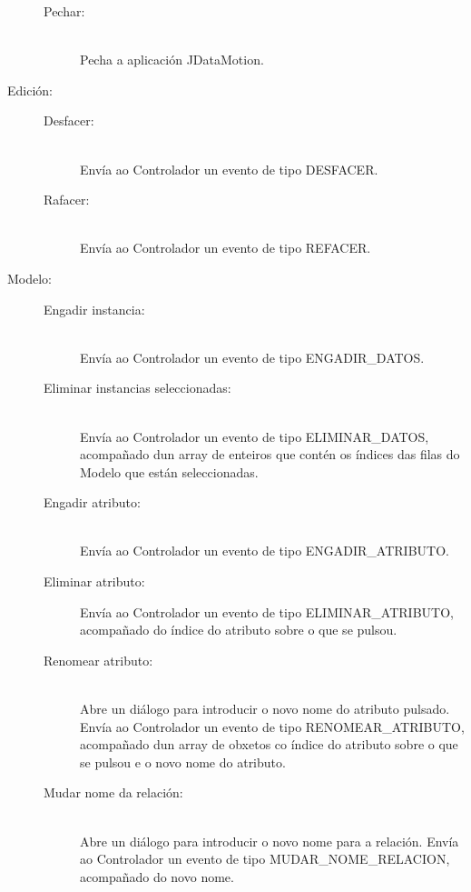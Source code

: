 \begin{description}
\begin{description}
\item[Pechar:] \hfill \\
Pecha a aplicación JDataMotion.

\end{description}

\item[Edición:] \hfill

\begin{description}

\item[Desfacer:] \hfill \\
Envía ao Controlador un evento de tipo DESFACER.

\item[Rafacer:] \hfill \\
Envía ao Controlador un evento de tipo REFACER.

\end{description}

\item[Modelo:] \hfill

\begin{description}

\item[Engadir instancia:] \hfill \\
Envía ao Controlador un evento de tipo ENGADIR\_DATOS.

\item[Eliminar instancias seleccionadas:] \hfill \\
Envía ao Controlador un evento de tipo ELIMINAR\_DATOS, acompañado dun array de enteiros que contén os índices das filas do Modelo que están seleccionadas.

\item[Engadir atributo:] \hfill \\
Envía ao Controlador un evento de tipo ENGADIR\_ATRIBUTO.

\item[Eliminar atributo:] Envía ao Controlador un evento de tipo ELIMINAR\_ATRIBUTO, acompañado do índice do atributo sobre o que se pulsou.

\item[Renomear atributo:] \hfill \\
Abre un diálogo para introducir o novo nome do atributo pulsado. Envía ao Controlador un evento de tipo RENOMEAR\_ATRIBUTO, acompañado dun array de obxetos co índice do atributo sobre o que se pulsou e o novo nome do atributo.

\item[Mudar nome da relación:] \hfill \\
Abre un diálogo para introducir o novo nome para a relación. Envía ao Controlador un evento de tipo MUDAR\_NOME\_RELACION, acompañado do novo nome.


\end{description}
\end{description}
